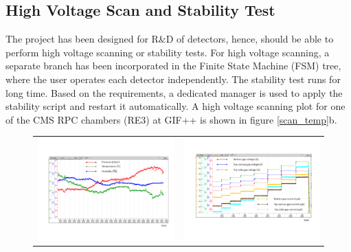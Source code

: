 \subsection{High Voltage Scan and Stability Test}
The project has been designed for R\&D of detectors, hence, should be able to perform high voltage scanning or stability tests. For high voltage scanning, a separate branch has been incorporated in the Finite State Machine (FSM) tree, where the user operates each detector independently. The stability test runs for long time. Based on the requirements, a dedicated manager is used to apply the stability script and restart it automatically. A high voltage scanning plot for one of the CMS RPC chambers (RE3) at GIF++ is shown in figure \ref{scan_temp}b. 

\begin{figure}[htp]
\centering
\begin{tabular}{cc}
\hspace{-0.3cm}
\includegraphics[scale=0.25,trim=50 70 20 90,clip]{fig/wincc/tprh.png}
& \hspace{-0.5cm} \includegraphics[scale=0.26,trim=50 100 45 80,clip]{fig/wincc/HV_Scan2.png}\\

\end{tabular}
\end{figure}
